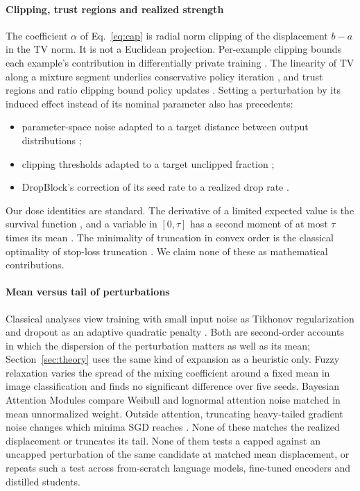 \paragraph{Clipping, trust regions and realized strength}
The coefficient $\alpha$ of Eq.~\eqref{eq:cap} is radial norm clipping \citep{koloskova2023revisiting} of the
displacement $b-a$ in the TV norm. It is not a Euclidean projection. Per-example clipping bounds each
example's contribution in differentially private training \citep{abadi2016deep}. The linearity of TV
along a mixture segment underlies conservative policy iteration \citep{kakade2002approximately}, and trust
regions and ratio clipping bound policy updates \citep{schulman2015trpo,schulman2017ppo}. Setting a perturbation by its
induced effect instead of its nominal parameter also has precedents:
\begin{itemize}
\item parameter-space noise adapted to a target distance between output distributions \citep{plappert2018parameter};
\item clipping thresholds adapted to a target unclipped fraction \citep{andrew2021adaptive};
\item DropBlock's correction of its seed rate to a realized drop rate \citep{ghiasi2018dropblock}.
\end{itemize}
Our dose identities are standard. The derivative of a limited expected value is the survival function
\citep{halliwell2012excess}, and a variable in $[0,\tau]$ has a second moment of at most $\tau$ times its mean
\citep{bartlett2005local}. The minimality of truncation in convex order is the classical optimality of
stop-loss truncation \citep{ohlin1969class,kaas2008modern}. We claim none of these as mathematical
contributions.

\paragraph{Mean versus tail of perturbations}
Classical analyses view training with small input noise as Tikhonov regularization \citep{bishop1995training} and
dropout as an adaptive quadratic penalty \citep{wager2013dropout}. Both are second-order accounts in
which the dispersion of the perturbation matters as well as its mean; Section~\ref{sec:theory} uses
the same kind of expansion as a heuristic only. Fuzzy relaxation \citep{lohrenz2023relaxed} varies the spread of
the mixing coefficient around a fixed mean in image classification and finds no significant difference
over five seeds. Bayesian Attention Modules \citep{fan2020bam} compare Weibull and lognormal attention noise
matched in mean unnormalized weight. Outside attention, truncating heavy-tailed gradient noise changes which
minima SGD reaches \citep{wang2022eliminating}. None of these matches the realized displacement or truncates
its tail. None of them tests a capped against an uncapped perturbation of the same candidate at matched mean
displacement, or repeats such a test across from-scratch language models, fine-tuned encoders and distilled
students.

